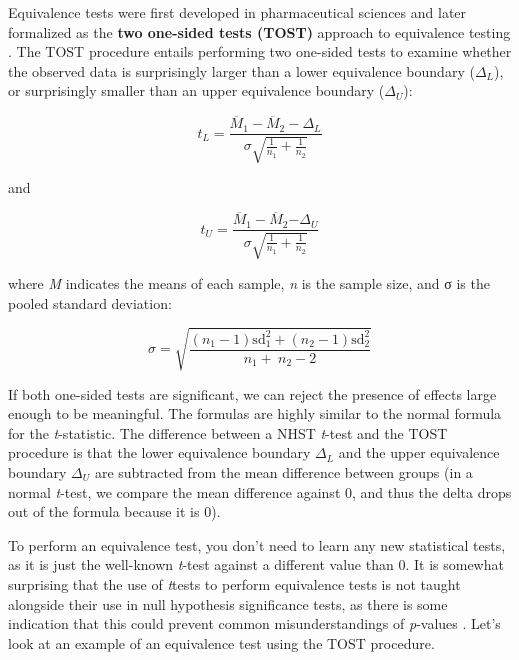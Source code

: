 \documentclass[
  oneside]{krantz}
\begin{document}
Equivalence tests were first developed in pharmaceutical sciences \citep{hauck_new_1984, westlake_use_1972} and later formalized as the \textbf{two one-sided tests (TOST)} approach to equivalence testing \citep{schuirmann_comparison_1987, seaman_equivalence_1998, wellek_testing_2010}. The TOST procedure entails performing two one-sided tests to examine whether the observed data is surprisingly larger than a lower equivalence boundary (\(\Delta_{L}\)), or surprisingly smaller than an upper equivalence boundary (\(\Delta_{U}\)):

\[
t_{L} = \frac{{\overline{M}}_{1} - {\overline{M}}_{2} - \Delta_{L}}{\sigma\sqrt{\frac{1}{n_{1}} + \frac{1}{n_{2}}}}
\]

and

\[
t_{U} = \frac{{\overline{M}}_{1} - {\overline{M}}_{2}{- \Delta}_{U}}{\sigma\sqrt{\frac{1}{n_{1}} + \frac{1}{n_{2}}}}
\]

where \emph{M} indicates the means of each sample, \emph{n} is the sample size, and σ is
the pooled standard deviation:

\[
\sigma = \sqrt{\frac{\left( n_{1} - 1 \right)\text{sd}_{1}^{2} + \left( n_{2} - 1 \right)\text{sd}_{2}^{2}}{n_{1} + \ n_{2} - 2}}
\]

If both one-sided tests are significant, we can reject the presence of effects large enough to be meaningful. The formulas are highly similar to the normal formula for the \emph{t}-statistic. The difference between a NHST \emph{t}-test and the TOST procedure is that the lower equivalence boundary \(\Delta_{L}\) and the upper equivalence boundary \(\Delta_{U}\) are subtracted from the mean difference between groups (in a normal \emph{t}-test, we compare the mean difference against 0, and thus the delta drops out of the formula because it is 0).

To perform an equivalence test, you don't need to learn any new statistical tests, as it is just the well-known \emph{t}-test against a different value than 0. It is somewhat surprising that the use of \emph{t}tests to perform equivalence tests is not taught alongside their use in null hypothesis significance tests, as there is some indication that this could prevent common misunderstandings of \emph{p}-values \citep{parkhurst_statistical_2001}. Let's look at an example of an equivalence test using the TOST procedure.
\end{document}
